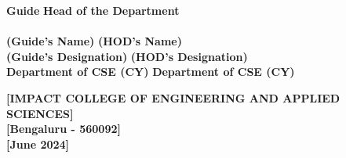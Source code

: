 \documentclass[12pt, a4paper]{report}
\begin{document}
\begin{titlepage}
\begin{center}
\textbf{Guide} \hspace{3.5in} \textbf{Head of the Department}\\
\vspace{0.3in}
\underline{\hspace{6cm}} \hspace{1.5in} \underline{\hspace{6cm}}\\
\vspace{0.1in}
\textbf{(Guide's Name)} \hspace{2.7in} \textbf{(HOD's Name)}\\
\vspace{0.1in}
\textbf{(Guide's Designation)} \hspace{2in} \textbf{(HOD's Designation)}\\
\vspace{0.1in}
\textbf{Department of CSE (CY)} \hspace{2.1in} \textbf{Department of CSE (CY)}\\
\vspace{0.3in}

\textbf{[IMPACT COLLEGE OF ENGINEERING AND APPLIED SCIENCES]}\\
\vspace{0.1in}
\textbf{[Bengaluru - 560092]}\\
\vspace{0.1in}
\textbf{[June 2024]}

\end{center}
\end{titlepage}
\end{document}
